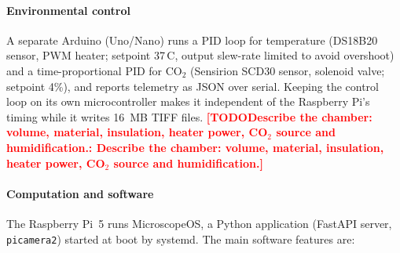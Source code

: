 \documentclass[preprint,12pt]{elsarticle}
\DeclareRobustCommand{\TODO}[1]{\textcolor{red}{\textbf{[TODO\ifx\relax#1\relax\else: #1\fi]}}}
\begin{document}
\paragraph{Environmental control} A separate Arduino (Uno/Nano) runs a PID
loop for temperature (DS18B20 sensor, PWM heater; setpoint 37\,\textdegree C,
output slew-rate limited to avoid overshoot) and a time-proportional PID for
CO$_2$ (Sensirion SCD30 sensor, solenoid valve; setpoint 4\%), and reports
telemetry as JSON over serial. Keeping the control loop on its own
microcontroller makes it independent of the Raspberry Pi's timing while it
writes 16~MB TIFF files. \TODO{Describe the chamber: volume, material,
insulation, heater power, CO$_2$ source and humidification.}

\paragraph{Computation and software} The Raspberry Pi~5 runs MicroscopeOS,
a Python application (FastAPI server, \texttt{picamera2}) started at boot
by systemd. The main software features are:
\end{document}
